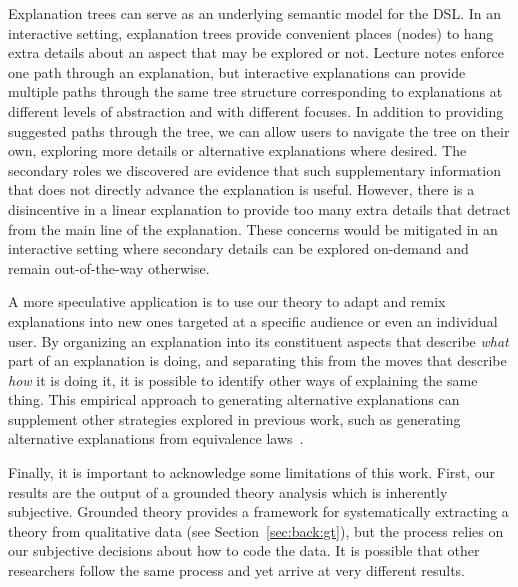 \documentclass[sigconf]{acmart}
\begin{document}
Explanation trees can serve as an underlying semantic model for the DSL.
%
In an interactive setting, explanation trees provide convenient places (nodes)
to hang extra details about an aspect that may be explored or not. Lecture
notes enforce one path through an explanation, but interactive explanations can
provide multiple paths through the same tree structure corresponding to
explanations at different levels of abstraction and with different focuses. In
addition to providing suggested paths through the tree, we can allow users to
navigate the tree on their own, exploring more details or alternative
explanations where desired.
%
The secondary roles we discovered are evidence that such supplementary
information that does not directly advance the explanation is useful. However,
there is a disincentive in a linear explanation to provide too many extra
details that detract from the main line of the explanation. These concerns
would be mitigated in an interactive setting where secondary details can be
explored on-demand and remain out-of-the-way otherwise.


A more speculative application is to use our theory to adapt and remix
explanations into new ones targeted at a specific audience or even an
individual user.
%
%
By organizing an explanation into its constituent aspects that describe
\emph{what} part of an explanation is doing, and separating this from the moves
that describe \emph{how} it is doing it, it is possible to identify other ways
of explaining the same thing.
%
%
This empirical approach to generating alternative explanations can supplement
other strategies explored in previous work, such as generating alternative
explanations from equivalence laws~\cite{EW13jvlc}.


Finally, it is important to acknowledge some limitations of this work.
%
First, our results are the output of a grounded theory analysis which is
inherently subjective. Grounded theory provides a framework for systematically
extracting a theory from qualitative data (see Section~\ref{sec:back:gt}), but
the process relies on our subjective decisions about how to code the data. It
is possible that other researchers follow the same process and yet arrive at
very different results.
\end{document}
